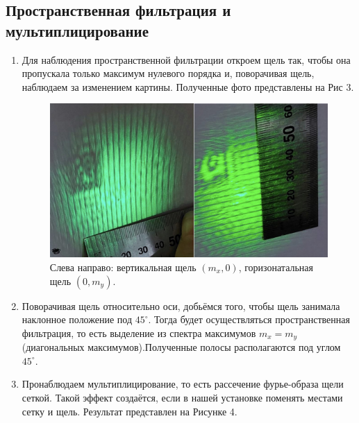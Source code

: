 \documentclass[a4paper,12pt]{article}
\begin{document}
\subsection{Пространственная фильтрация и мультиплицирование}
\begin{enumerate}
\item  Для наблюдения пространственной фильтрации откроем щель так, чтобы она пропускала только максимум нулевого порядка и, поворачивая щель, наблюдаем за изменением картины. Полученные фото представлены на Рис 3.

\begin{figure}[h!]
\includegraphics[scale=0.3]{14.jpg}
\centering
\caption{Слева направо: вертикальная щель $(m_x,0)$, горизонатальная щель $(0,m_y)$.}
\end{figure}
\item Поворачивая щель относительно оси, добьёмся того, чтобы щель занимала наклонное положение под $45^\circ$. Тогда будет осуществляться пространственная фильтрация, то есть выделение из спектра максимумов $m_x = m_y$ (диагональных максимумов).Полученные полосы располагаются под углом $45^\circ$. 
\item Пронаблюдаем мультиплицирование, то есть рассечение фурье-образа щели сеткой. Такой эффект создаётся, если в нашей установке поменять местами сетку и щель. Результат представлен на Рисунке 4.



\end{enumerate}
\end{document}
